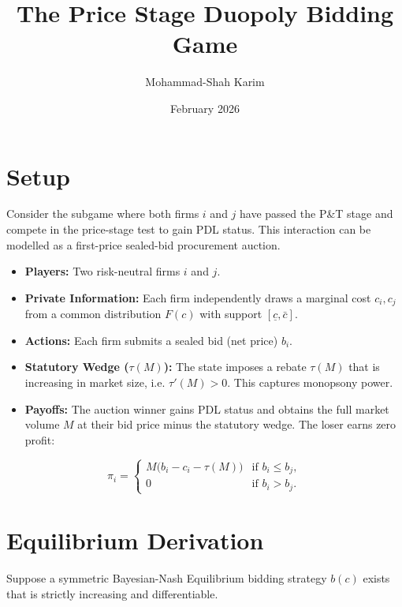 \documentclass[12pt]{article}
\title{The Price Stage Duopoly Bidding Game}
\author{Mohammad-Shah Karim}
\date{February 2026}
\begin{document}
\maketitle

\tableofcontents

\newpage

\section{Setup}

Consider the subgame where both firms $i$ and $j$ have passed the P\&T stage and compete in the price-stage test to gain PDL status. This interaction can be modelled as a first-price sealed-bid procurement auction.

\begin{itemize}
    \item \textbf{Players:} Two risk-neutral firms $i$ and $j$.

    \item \textbf{Private Information:} Each firm independently draws a marginal cost 
    $c_i, c_j$ from a common distribution $F(c)$ with support 
    $[\underline{c}, \bar{c}]$.

    \item \textbf{Actions:} Each firm submits a sealed bid (net price) $b_i$.

    \item \textbf{Statutory Wedge ($\tau(M)$):} The state imposes a rebate 
    $\tau(M)$ that is increasing in market size, i.e. $\tau'(M) > 0$. 
    This captures monopsony power.

    \item \textbf{Payoffs:} The auction winner gains PDL status and obtains 
    the full market volume $M$ at their bid price minus the statutory wedge. 
    The loser earns zero profit:
\end{itemize}

\[
\pi_i =
\begin{cases}
M\big(b_i - c_i - \tau(M)\big) & \text{if } b_i \leq b_j, \\
0 & \text{if } b_i > b_j.
\end{cases}
\]

\newpage

\section{Equilibrium Derivation}

Suppose a symmetric Bayesian-Nash Equilibrium bidding strategy $b(c)$ exists that is strictly increasing and differentiable.
\end{document}
